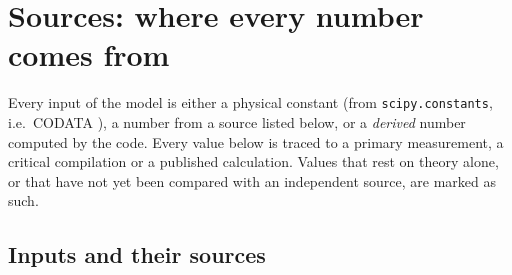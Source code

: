 \section{Sources: where every number comes from}\label{sec:sources}
Every input of the model is either a physical constant (from \texttt{scipy.constants}, i.e.\ CODATA \cite{codata}), a number from a source listed below, or a \emph{derived} number computed by the code.
Every value below is traced to a primary measurement, a critical compilation or a published calculation. Values that rest on theory alone, or that have not yet been compared with an independent source, are marked as such.

\subsection{Inputs and their sources}

